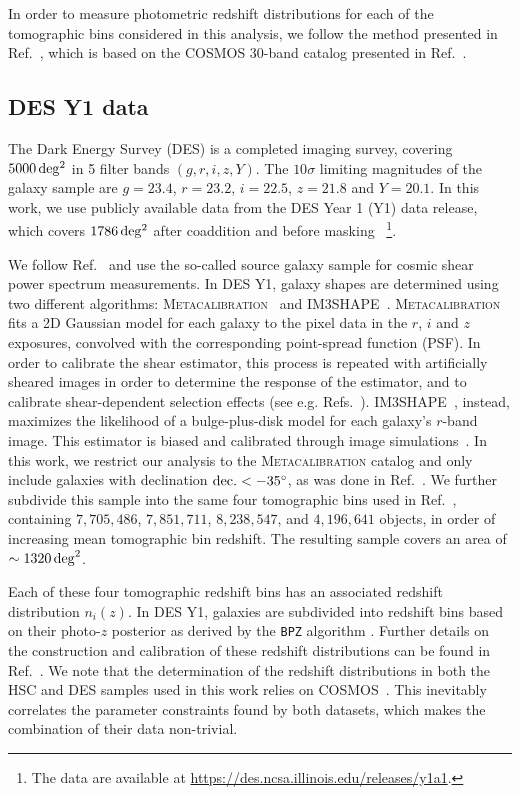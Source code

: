 \documentclass[a4paper,11pt]{article}
\newcommand{\mcal}{\textsc{Metacalibration}}
\begin{document}
      In order to measure photometric redshift distributions for each of the tomographic bins considered in this analysis, we follow the method presented in Ref.~\cite{1912.08209}, which is based on the COSMOS 30-band catalog presented in Ref.~\cite{1604.02350}.

    \subsection{DES Y1 data}\label{ssec:data.des}
       The Dark Energy Survey (DES) is a completed imaging survey, covering $\unit[5000]{deg^2}$ in 5 filter bands $(g,r,i,z,Y)$. The $10\sigma$ limiting magnitudes of the galaxy sample are $g = 23.4$, $r = 23.2$, $i = 22.5$, $z = 21.8$ and $Y = 20.1$. In this work, we use publicly available data from the DES Year 1 (Y1) data release, which  covers $\unit[1786]{deg^2}$ after coaddition and before masking ~\cite{1801.03181,1708.01531}\footnote{The data are available at \url{https://des.ncsa.illinois.edu/releases/y1a1}.}. 

      We follow Ref.~\cite{1708.01533} and use the so-called source galaxy sample for cosmic shear power spectrum measurements. In DES Y1, galaxy shapes are
      determined using two different algorithms: \mcal{}~\cite{1702.02600,1702.02601} and \textsc{IM3SHAPE}~\cite{1708.01533}. \mcal{}~\cite{1702.02600,1702.02601} fits a 2D Gaussian model for each galaxy to the pixel data in the $r$, $i$ and $z$ exposures, convolved with the corresponding point-spread function (PSF). In order to calibrate the shear estimator, this process is repeated with artificially sheared images in order to determine the response of the estimator, and to calibrate shear-dependent selection effects (see e.g. Refs.~\cite{1708.01533,1708.01537,1708.01538,1702.02601}). \textsc{IM3SHAPE}~\cite{1302.0183}, instead, maximizes the likelihood of a bulge-plus-disk model for each galaxy's $r$-band image. This estimator is biased and calibrated through image simulations~\cite{1708.01533,1708.01534}. In this work, we restrict our analysis to the \mcal{} catalog and only include galaxies with declination ${\rm dec.}<-35^\circ$, as was done in Ref.~\cite{1708.01533}. We further subdivide this sample into the same four tomographic bins used in Ref.~\cite{1708.01533}, containing $7{,}705{,}486$, $7{,}851{,}711$, $8{,}238{,}547$, and $4{,}196{,}641$ objects, in order of increasing mean tomographic bin redshift. The resulting sample covers an area of $\sim1320\,{\rm deg}^2$.

      Each of these four tomographic redshift bins has an associated redshift distribution $n_i(z)$. In DES Y1, galaxies are subdivided into redshift bins based on their photo-$z$ posterior as derived by the {\tt BPZ} algorithm \cite{astro-ph/9811189}. Further details on the construction and calibration of these redshift distributions can be found in Ref.~\cite{1708.01532}. We note that the determination of the redshift distributions in both the HSC and DES samples used in this work relies on COSMOS~\cite{1604.02350}. This inevitably correlates the parameter constraints found by both datasets, which makes the combination of their data non-trivial.
\end{document}
